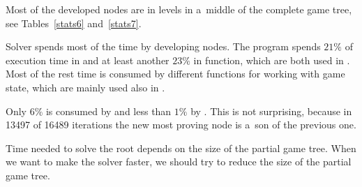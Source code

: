 Most of the developed nodes are in levels in a~middle of the complete game tree, see
Tables~\ref{stats6} and~\ref{stats7}. 

Solver spends most of the time by developing nodes. The program spends $21\%$ of
execution time in  and at least another $23\%$ in
 function, which are both used in .  Most of
the rest time is consumed by different functions for working with game state,
which are mainly used also in .

Only $6\%$ is consumed by  and less than $1\%$ by
. This is not surprising, because in 13497 of 16489
iterations the new most proving node is a~son of the previous one.

Time needed to solve the root depends on the size of the partial game tree.
When we want to make the solver faster, we should try to reduce the size of the
partial game tree.

